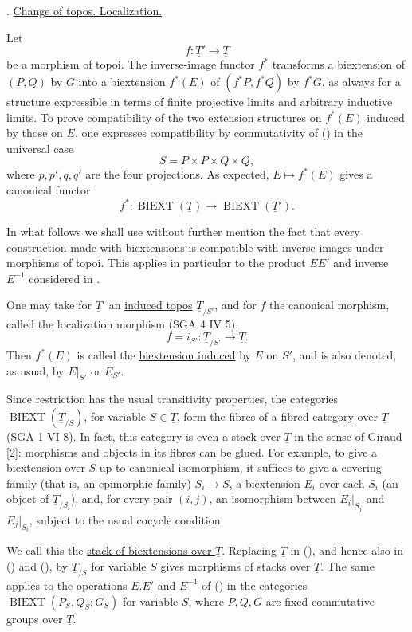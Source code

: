 
. \underline{Change of topos. Localization.}

Let
\[
 f:\underline T'\longrightarrow\underline T
\]
be a morphism of topoi. The inverse-image functor $f^*$ transforms a
biextension of $(P,Q)$ by $G$ into a biextension $f^*(E)$ of
$(f^*P,f^*Q)$ by $f^*G$, as always for a structure expressible in
terms of finite projective limits and arbitrary inductive limits. To
prove compatibility of the two extension structures on $f^*(E)$
induced by those on $E$, one expresses compatibility by commutativity
of () in the universal case
\[
 S=P\times P\times Q\times Q,
\]
where $p,p',q,q'$ are the four projections. As expected,
$E\mapsto f^*(E)$ gives a canonical functor
\[
 f^*:\operatorname{BIEXT}(\underline T)
 \longrightarrow
 \operatorname{BIEXT}(\underline T').
\]

In what follows we shall use without further mention the fact that
every construction made with biextensions is compatible with inverse
images under morphisms of topoi. This applies in particular to the
product $EE'$ and inverse $E^{-1}$ considered in .

One may take for $\underline T'$ an \underline{induced topos}
$\underline T_{/S'}$, and for $f$ the canonical morphism, called the
localization morphism (SGA 4 IV 5),
\[
 f=i_{S'}:\underline T_{/S'}\longrightarrow\underline T.
\]
Then $f^*(E)$ is called the \underline{biextension induced} by $E$ on
$S'$, and is also denoted, as usual, by $E|_{S'}$ or $E_{S'}$.

Since restriction has the usual transitivity properties, the
categories $\operatorname{BIEXT}(\underline T_{/S})$, for variable
$S\in\underline T$, form the fibres of a \underline{fibred category}
over $\underline T$ (SGA 1 VI 8). In fact, this category is even a
\underline{stack} over $\underline T$ in the sense of Giraud [2]:
morphisms and objects in its fibres can be glued. For example, to give
a biextension over $S$ up to canonical isomorphism, it suffices to give
a covering family (that is, an epimorphic family) $S_i\longrightarrow
S$, a biextension $E_i$ over each $S_i$ (an object of
$\underline T_{/S_i}$), and, for every pair $(i,j)$, an isomorphism
between $E_i|_{S_j}$ and $E_j|_{S_i}$, subject to the usual cocycle
condition.

We call this the \underline{stack of biextensions over $\underline T$}.
Replacing $\underline T$ in (), and hence also in () and
(), by $\underline T_{/S}$ for variable $S$ gives morphisms of
stacks over $\underline T$. The same applies to the operations $E.E'$
and $E^{-1}$ of () in the categories
$\operatorname{BIEXT}(P_S,Q_S;G_S)$ for variable $S$, where $P,Q,G$
are fixed commutative groups over $\underline T$.

